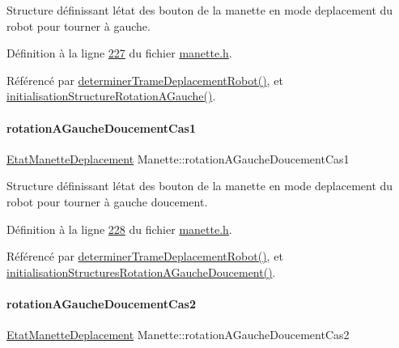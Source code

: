 Structure définissant l\textquotesingle{}état des bouton de la manette en mode deplacement du robot pour tourner à gauche. 



Définition à la ligne \hyperlink{manette_8h_source_l00227}{227} du fichier \hyperlink{manette_8h_source}{manette.\+h}.



Référencé par \hyperlink{manette_8cpp_source_l00341}{determiner\+Trame\+Deplacement\+Robot()}, et \hyperlink{manette_8cpp_source_l00151}{initialisation\+Structure\+Rotation\+A\+Gauche()}.

\mbox{\label{class_manette_ac24e87d64418d5667a378b2f508a0759}} 
\paragraph{\texorpdfstring{rotation\+A\+Gauche\+Doucement\+Cas1}{rotationAGaucheDoucementCas1}}
{\footnotesize\ttfamily \hyperlink{struct_etat_manette_deplacement}{Etat\+Manette\+Deplacement} Manette\+::rotation\+A\+Gauche\+Doucement\+Cas1\hspace{0.3cm}{\ttfamily [private]}}



Structure définissant l\textquotesingle{}état des bouton de la manette en mode deplacement du robot pour tourner à gauche doucement. 



Définition à la ligne \hyperlink{manette_8h_source_l00228}{228} du fichier \hyperlink{manette_8h_source}{manette.\+h}.



Référencé par \hyperlink{manette_8cpp_source_l00341}{determiner\+Trame\+Deplacement\+Robot()}, et \hyperlink{manette_8cpp_source_l00161}{initialisation\+Structures\+Rotation\+A\+Gauche\+Doucement()}.

\mbox{\label{class_manette_a21fa44eaadd677f97cdc876da8fe3143}} 
\paragraph{\texorpdfstring{rotation\+A\+Gauche\+Doucement\+Cas2}{rotationAGaucheDoucementCas2}}
{\footnotesize\ttfamily \hyperlink{struct_etat_manette_deplacement}{Etat\+Manette\+Deplacement} Manette\+::rotation\+A\+Gauche\+Doucement\+Cas2\hspace{0.3cm}{\ttfamily [private]}}



